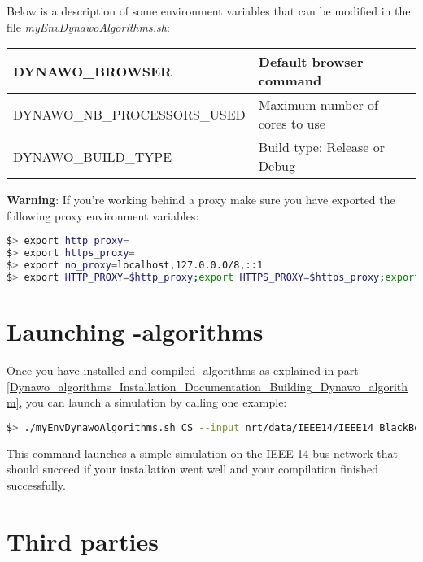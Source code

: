 \documentclass[a4paper, 12pt]{report}
\begin{document}
Below is a description of some environment variables that can be modified in the file \textit{myEnvDynawoAlgorithms.sh}:

\begin{center}
\begin{tabular}{|l|l|}
  \hline
   DYNAWO\_BROWSER & Default browser command \\
  \hline
   DYNAWO\_NB\_PROCESSORS\_USED & Maximum number of cores to use \\
  \hline
   DYNAWO\_BUILD\_TYPE & Build type: Release or Debug \\
  \hline
\end{tabular}
\end{center}

\textbf{Warning}: If you're working behind a proxy make sure you have exported the following proxy environment variables:

\begin{lstlisting}[language=bash]
$> export http_proxy=
$> export https_proxy=
$> export no_proxy=localhost,127.0.0.0/8,::1
$> export HTTP_PROXY=$http_proxy;export HTTPS_PROXY=$https_proxy;export NO_PROXY=$no_proxy;
\end{lstlisting}

\section[Launching Dynawo-algorithms]{Launching \Dynawo-algorithms}

Once you have installed and compiled \Dynawo-algorithms as explained in part \ref{Dynawo_algorithms_Installation_Documentation_Building_Dynawo_algorithm}, 
you can launch a simulation by calling one example:

\begin{lstlisting}[language=bash, breaklines=true, breakatwhitespace=false]
$> ./myEnvDynawoAlgorithms.sh CS --input nrt/data/IEEE14/IEEE14_BlackBoxModels/IEEE14.jobs
\end{lstlisting}

This command launches a simple simulation on the IEEE 14-bus network that should succeed if your installation went well and your compilation finished successfully.

\section{Third parties}
\end{document}
